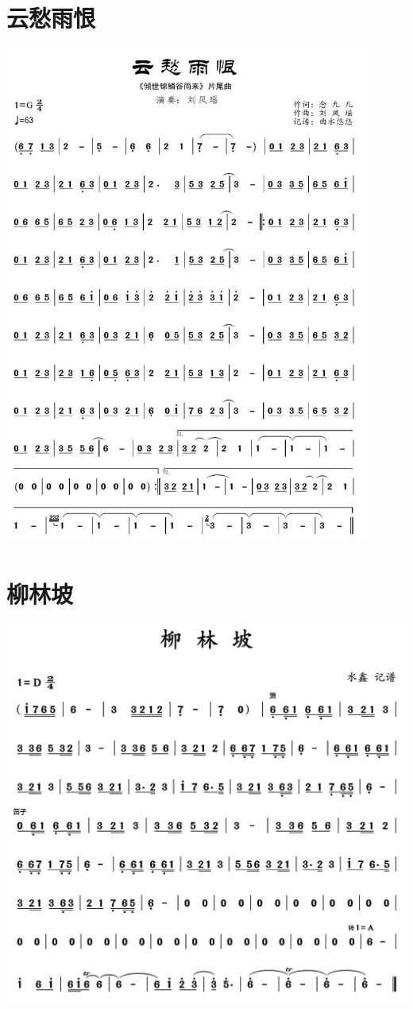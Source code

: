 \documentclass[cn,pad,twocol]{elegantbook}
\begin{document}
\section{云愁雨恨}  \includegraphics[width=0.9\textwidth]{rpi400/20201226云愁雨恨.png}
\section{柳林坡}    \includegraphics[width=\textwidth]{dongxiao/20201231-柳林坡}
\end{document}
